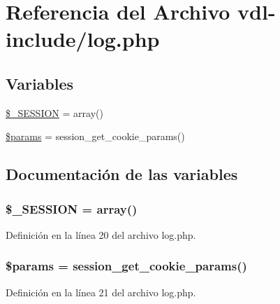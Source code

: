 \hypertarget{log_8php}{\section{Referencia del Archivo vdl-\/include/log.php}
\label{log_8php}
}
\subsection*{Variables}
\begin{DoxyCompactItemize}
\item 
\hyperlink{log_8php_a5f545b9684799a00f7a14442205b98e3}{\$\-\_\-\-S\-E\-S\-S\-I\-O\-N} = array()
\item 
\hyperlink{log_8php_afe68e6fbe7acfbffc0af0c84a1996466}{\$params} = session\-\_\-get\-\_\-cookie\-\_\-params()
\end{DoxyCompactItemize}


\subsection{Documentación de las variables}
\hypertarget{log_8php_a5f545b9684799a00f7a14442205b98e3}{
\subsubsection[{\$\-\_\-\-S\-E\-S\-S\-I\-O\-N}]{\setlength{\rightskip}{0pt plus 5cm}\$\-\_\-\-S\-E\-S\-S\-I\-O\-N = array()}}\label{log_8php_a5f545b9684799a00f7a14442205b98e3}


Definición en la línea 20 del archivo log.\-php.

\hypertarget{log_8php_afe68e6fbe7acfbffc0af0c84a1996466}{
\subsubsection[{\$params}]{\setlength{\rightskip}{0pt plus 5cm}\$params = session\-\_\-get\-\_\-cookie\-\_\-params()}}\label{log_8php_afe68e6fbe7acfbffc0af0c84a1996466}


Definición en la línea 21 del archivo log.\-php.

